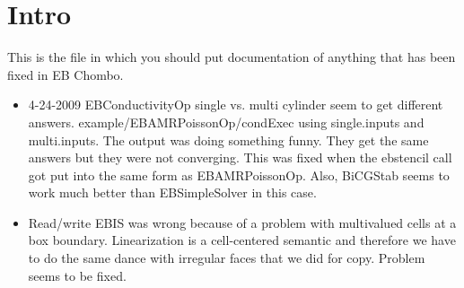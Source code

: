 \section{Intro}

This is the file in which you should put documentation of anything
that has been fixed in EB Chombo.

\begin{itemize}

\item{4-24-2009}  EBConductivityOp single vs. multi cylinder seem to
  get different answers.   example/EBAMRPoissonOp/condExec using
  single.inputs and multi.inputs.   The output was doing something
  funny.  They get the same answers but they were not converging.
  This was fixed when the ebstencil call got put into the same form as
  EBAMRPoissonOp.  Also, BiCGStab seems to work much better than
  EBSimpleSolver in this case.
  

\item Read/write EBIS was wrong because of a problem with multivalued
cells at a box boundary.   Linearization is a cell-centered semantic
and therefore we have to do the same dance with irregular faces that
we did for copy.   Problem seems to be fixed. 

\end{itemize}

